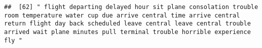 \documentclass[
]{article}
\begin{document}
\begin{verbatim}
##  [62] " flight departing delayed hour sit plane consolation trouble room temperature water cup due arrive central time arrive central return flight day back scheduled leave central leave central trouble arrived wait plane minutes pull terminal trouble horrible experience fly "                                                                                                                                                                                                                                                                                                                                                                                                                                                                                                                                                                                                                                                                                                                                                                                                                                                                                                                                                                                                                                                                                                                                                                                                                                                                                                                                                                                                                                                                                                                 

\end{verbatim}
\end{document}
